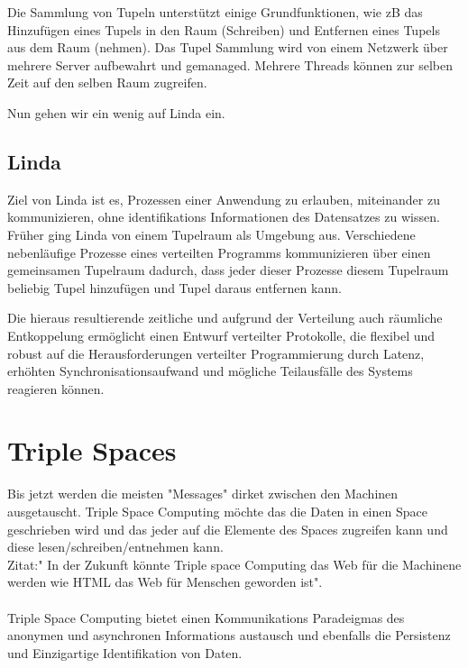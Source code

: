 \documentclass[a4paper,12pt]{scrreprt}
\begin{document}
		Die Sammlung von Tupeln unterstützt einige Grundfunktionen, wie zB das Hinzufügen eines Tupels in den Raum (Schreiben) und Entfernen eines Tupels aus dem Raum (nehmen). Das Tupel Sammlung wird von einem Netzwerk über mehrere Server aufbewahrt und gemanaged. Mehrere Threads können  zur selben Zeit auf den selben Raum zugreifen.
		
		Nun gehen wir ein wenig auf Linda ein.
		
		\subsection{Linda}
		Ziel von Linda ist es, Prozessen einer Anwendung zu erlauben, miteinander zu kommunizieren, ohne identifikations Informationen des Datensatzes zu wissen. Früher ging Linda  von einem Tupelraum  als Umgebung aus. Verschiedene nebenläufige Prozesse eines verteilten Programms kommunizieren über einen gemeinsamen Tupelraum dadurch, dass jeder dieser Prozesse diesem Tupelraum beliebig Tupel hinzufügen und Tupel daraus entfernen kann.
		
		Die hieraus resultierende zeitliche und aufgrund der Verteilung auch räumliche Entkoppelung ermöglicht einen Entwurf verteilter Protokolle, die flexibel und robust auf die Herausforderungen verteilter Programmierung durch Latenz, erhöhten Synchronisationsaufwand und mögliche Teilausfälle des Systems reagieren können. %
		
		
		\section{Triple Spaces}
		
		Bis jetzt werden die meisten "Messages" dirket zwischen den Machinen ausgetauscht. Triple Space Computing möchte das die Daten in einen
		Space geschrieben wird und das jeder auf die Elemente des Spaces zugreifen kann und diese lesen/schreiben/entnehmen kann.\\
		Zitat:" In der Zukunft könnte Triple space Computing das Web für die Machinene werden wie HTML das Web für Menschen geworden ist".\\ \\
		Triple Space Computing bietet einen Kommunikations Paradeigmas des anonymen und asynchronen Informations austausch und ebenfalls die 
		Persistenz und Einzigartige Identifikation von Daten.\\
			
		
\end{document}

